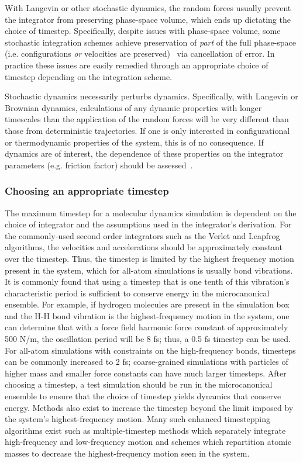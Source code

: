 \documentclass[9pt,bestpractices]{livecoms}
\begin{document}
With Langevin or other stochastic dynamics, the random forces usually prevent the integrator from preserving phase-space volume, which ends up dictating the choice of timestep.
Specifically, despite issues with phase-space volume, some stochastic integration schemes achieve preservation of \textit{part} of the full phase-space (i.e. configurations \textit{or} velocities are preserved)~\cite{Fass2018} via cancellation of error.
In practice these issues are easily remedied through an appropriate choice of timestep depending on the integration scheme.

Stochastic dynamics necessarily perturbs dynamics. 
Specifically, with Langevin or Brownian dynamics, calculations of any dynamic properties with longer timescales than the application of the random forces will be very different than those from deterministic trajectories.
If one is only interested in configurational or thermodynamic properties of the system, this is of no consequence.
If dynamics are of interest, the dependence of these properties on the integrator parameters (e.g. friction factor) should be assessed~\cite{Basconi:2013:JChemTheoryComput}.


\subsubsection{Choosing an appropriate timestep}

The maximum timestep for a molecular dynamics simulation is dependent on the choice of integrator and the assumptions used in the integrator's derivation.
For the commonly-used second order integrators such as the Verlet and Leapfrog algorithms, the velocities and accelerations should be approximately constant over the timestep.
Thus, the timestep is limited by the highest frequency motion present in the system, which for all-atom simulations is usually bond vibrations.
It is commonly found that using a timestep that is one tenth of this vibration's characteristic period is sufficient to conserve energy in the microcanonical ensemble.
For example, if hydrogen molecules are present in the simulation box and the H-H bond vibration is the highest-frequency motion in the system, one can determine that with a force field harmonic force constant of approximately 500 N/m, the oscillation period will be 8 fs; thus, a 0.5 fs timestep can be used.
For all-atom simulations with constraints on the high-frequency bonds, timesteps can be commonly increased to 2 fs; coarse-grained simulations with particles of higher mass and smaller force constants can have much larger timesteps.
After choosing a timestep, a test simulation should be run in the microcanonical ensemble to ensure that the choice of timestep yields dynamics that conserve energy.
Methods also exist to increase the timestep beyond the limit imposed by the system's highest-frequency motion.
Many such enhanced timestepping algorithms exist such as multiple-timestep methods which separately integrate high-frequency and low-frequency motion and schemes which repartition atomic masses to decrease the highest-frequency motion seen in the system\cite{Berne:1999:Molecular,Hopkins:2015:JCTC:Long}.
\end{document}

